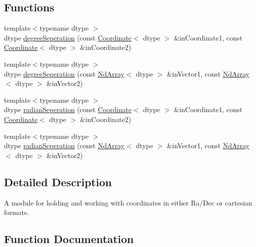 \subsection*{Functions}
\begin{DoxyCompactItemize}
\item 
{\footnotesize template$<$typename dtype $>$ }\\dtype \mbox{\hyperlink{namespace_num_cpp_1_1_coordinates_a063ca826702d5afecd7607ac61ee6e88}{degree\+Seperation}} (const \mbox{\hyperlink{class_num_cpp_1_1_coordinates_1_1_coordinate}{Coordinate}}$<$ dtype $>$ \&in\+Coordinate1, const \mbox{\hyperlink{class_num_cpp_1_1_coordinates_1_1_coordinate}{Coordinate}}$<$ dtype $>$ \&in\+Coordinate2)
\item 
{\footnotesize template$<$typename dtype $>$ }\\dtype \mbox{\hyperlink{namespace_num_cpp_1_1_coordinates_a1bd451cf9737de1038420b005b9ccf48}{degree\+Seperation}} (const \mbox{\hyperlink{class_num_cpp_1_1_nd_array}{Nd\+Array}}$<$ dtype $>$ \&in\+Vector1, const \mbox{\hyperlink{class_num_cpp_1_1_nd_array}{Nd\+Array}}$<$ dtype $>$ \&in\+Vector2)
\item 
{\footnotesize template$<$typename dtype $>$ }\\dtype \mbox{\hyperlink{namespace_num_cpp_1_1_coordinates_a2c41aaaa5c660d3ec0d9ab23327f4d44}{radian\+Seperation}} (const \mbox{\hyperlink{class_num_cpp_1_1_coordinates_1_1_coordinate}{Coordinate}}$<$ dtype $>$ \&in\+Coordinate1, const \mbox{\hyperlink{class_num_cpp_1_1_coordinates_1_1_coordinate}{Coordinate}}$<$ dtype $>$ \&in\+Coordinate2)
\item 
{\footnotesize template$<$typename dtype $>$ }\\dtype \mbox{\hyperlink{namespace_num_cpp_1_1_coordinates_a1395767e51f62c2fa7d7106decf65172}{radian\+Seperation}} (const \mbox{\hyperlink{class_num_cpp_1_1_nd_array}{Nd\+Array}}$<$ dtype $>$ \&in\+Vector1, const \mbox{\hyperlink{class_num_cpp_1_1_nd_array}{Nd\+Array}}$<$ dtype $>$ \&in\+Vector2)
\end{DoxyCompactItemize}


\subsection{Detailed Description}
A module for holding and working with coordinates in either Ra/\+Dec or cartesian formats. 

\subsection{Function Documentation}
\mbox{\label{namespace_num_cpp_1_1_coordinates_a063ca826702d5afecd7607ac61ee6e88}} 
